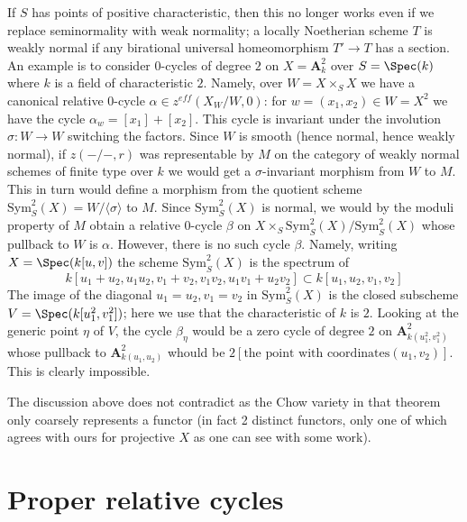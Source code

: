 \begin{remark}
\medskip\noindent
If $S$ has points of positive characteristic, then this no longer works
even if we replace seminormality with weak normality; a locally Noetherian
scheme $T$ is weakly normal if any birational universal homeomorphism
$T' \to T$ has a section. An example is to consider $0$-cycles of degree
$2$ on $X = \mathbf{A}^2_k$ over $S = \Spec(k)$ where $k$ is a field of
characteristic $2$. Namely, over $W = X \times_S X$ we have a canonical
relative $0$-cycle $\alpha \in z^{eff}(X_W/W, 0)$: for
$w = (x_1, x_2) \in W = X^2$ we have the cycle $\alpha_w = [x_1] + [x_2]$.
This cycle is invariant under the involution $\sigma : W \to W$ switching
the factors. Since $W$ is smooth (hence normal, hence weakly normal), if
$z(-/-, r)$ was representable by $M$ on the category of weakly normal
schemes of finite type over $k$ we would get a $\sigma$-invariant
morphism from $W$ to $M$. This in turn would define a morphism from the
quotient scheme $\text{Sym}^2_S(X) = W/\langle \sigma \rangle$ to $M$.
Since $\text{Sym}^2_S(X)$ is normal, we would by the moduli property of $M$
obtain a relative $0$-cycle $\beta$ on
$X \times_S \text{Sym}^2_S(X) / \text{Sym}^2_S(X)$
whose pullback to $W$ is $\alpha$. However, there is no such cycle $\beta$.
Namely, writing $X = \Spec(k[u, v])$ the scheme
$\text{Sym}^2_S(X)$ is the spectrum of
$$
k[u_1 + u_2, u_1u_2, v_1 + v_2, v_1v_2, u_1v_1 + u_2v_2]
\subset
k[u_1, u_2, v_1, v_2]
$$
The image of the diagonal $u_1 = u_2, v_1 = v_2$ in $\text{Sym}^2_S(X)$
is the closed subscheme $V = \Spec(k[u_1^2, v_1^2])$; here we use that
the characteristic of $k$ is $2$. Looking at the
generic point $\eta$ of $V$, the cycle $\beta_\eta$ would be a zero
cycle of degree $2$ on $\mathbf{A}^2_{k(u_1^2, v_1^2)}$
whose pullback to $\mathbf{A}^2_{k(u_1, u_2)}$ whould be
$2[\text{the point with coordinates} (u_1, v_2)]$.
This is clearly impossible.

\medskip\noindent
The discussion above does not contradict \cite[Theorem 4.13]{KRC} as the Chow
variety in that theorem only coarsely represents a functor (in fact 2
distinct functors, only one of which agrees with ours for projective $X$
as one can see with some work).
\end{remark}











\section{Proper relative cycles}
\label{section-proper}

